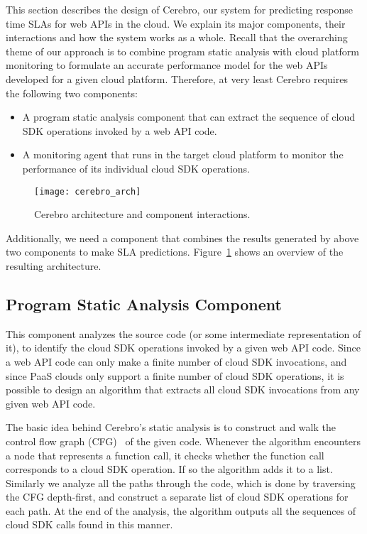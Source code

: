 This section describes the design of Cerebro, our system for predicting response time SLAs for
web APIs in the cloud. We explain its major components, their interactions and how the 
system works as a whole. Recall that the overarching theme of our approach is to combine program
static analysis with cloud platform monitoring to formulate an accurate performance model for the 
web APIs developed for a given cloud platform. Therefore, at very least Cerebro requires the following 
two components:

\begin{itemize}
\item A program static analysis component that can extract the sequence of cloud SDK operations invoked by a web API
code.
\item A monitoring agent that runs in the target cloud platform to monitor the performance of its individual cloud SDK
operations.
\end{itemize}

\begin{figure}
\centering
\texttt{[image: cerebro\_arch]}
\caption{Cerebro architecture and component interactions.}
\label{fig:cerebro_arch}
\end{figure}

Additionally, we need a component that combines the results generated by above two components
to make SLA predictions. Figure~\ref{fig:cerebro_arch} shows an overview of the resulting architecture.
 
 \subsection{Program Static Analysis Component}
 This component analyzes the source code (or some intermediate representation of it), to identify
 the cloud SDK operations invoked by a given web API code. Since a web API code can only make a finite
 number of cloud SDK invocations, and since PaaS clouds only support a finite number of cloud
 SDK operations, it is possible to design an algorithm that
 extracts all cloud SDK invocations from any given web API code. 

The basic idea behind Cerebro's static analysis is to construct and walk the
 control flow graph (CFG)~\cite{Allen:1970:CFA:800028.808479,Aho:1986:CPT:6448,Morgan:1998:BOC:288765,Muchnick:1998:ACD:286076} of the given code. 
Whenever the 
 algorithm encounters a node that represents a function call,
 it checks whether the function call corresponds to a cloud SDK operation. If so the algorithm
adds it to a list. Similarly we analyze all the paths through the code, which is done
by traversing the CFG depth-first, and construct a separate list of cloud SDK operations
for each path. At the end of the analysis, the algorithm outputs all the sequences of cloud SDK
calls found in this manner.


